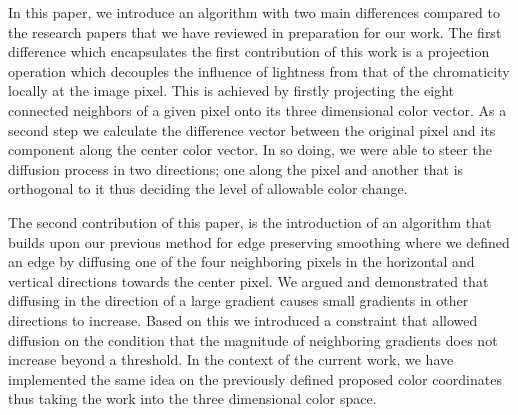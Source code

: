In this paper, we introduce an algorithm with two main differences compared to the research papers that we have reviewed in preparation for our work. The first difference which encapsulates the first contribution of this work is a projection operation which decouples the influence of lightness from that of the chromaticity locally at the image pixel. This is achieved by firstly projecting the eight connected neighbors of a given pixel onto its three dimensional color vector. As a second step we calculate the difference vector between the original pixel and its component along the center color vector. In so doing, we were able to steer the diffusion process in two directions; one along the pixel and another that is orthogonal to it thus deciding the level of allowable color change.

The second contribution of this paper, is the introduction of an algorithm that builds upon our previous method for edge preserving smoothing where we defined an edge by diffusing one of the four neighboring pixels in the horizontal and vertical directions towards the center pixel. We argued and demonstrated that diffusing in the direction of a large gradient causes small gradients in other directions to increase. Based on this we introduced a constraint that allowed diffusion on the condition that the magnitude of neighboring gradients does not increase beyond a threshold. In the context of the current work, we have implemented the same idea on the previously defined proposed color coordinates thus taking the work into the three dimensional color space.







%


